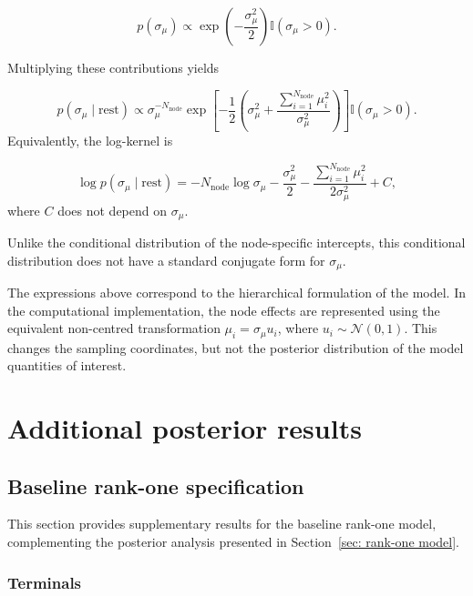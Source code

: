 \documentclass[pdftex,12pt,openright,a4paper,oneside]{book}
\begin{document}
\begin{equation*}
p(\sigma_\mu)
\propto
\exp\left(
-\frac{\sigma_\mu^2}{2}
\right)
\mathbb{I}(\sigma_\mu>0).
\end{equation*}

Multiplying these contributions yields

\begin{equation*}
p(\sigma_\mu\mid\mathrm{rest})
\propto 
\sigma_\mu^{-N_{\mathrm{node}}}
\exp\left[
-\frac12
\left(
\sigma_\mu^2+
\frac{
\sum_{i=1}^{N_{\mathrm{node}}}\mu_i^2
}{
\sigma_\mu^2
}
\right)
\right]
\mathbb{I}(\sigma_\mu>0).
\end{equation*}
Equivalently, the log-kernel is

\begin{equation*}
\log p(\sigma_\mu\mid\mathrm{rest})
=
-N_{\mathrm{node}}\log\sigma_\mu
-\frac{\sigma_\mu^2}{2}
-\frac{
\sum_{i=1}^{N_{\mathrm{node}}}\mu_i^2
}{
2\sigma_\mu^2
}
+C,
\end{equation*}
where $C$ does not depend on $\sigma_\mu$.

Unlike the conditional distribution of the
node-specific intercepts, this conditional
distribution does not have a standard
conjugate form for $\sigma_\mu$.

The expressions above correspond to the
hierarchical formulation of the model.
In the computational implementation,
the node effects are represented using
the equivalent non-centred transformation
$\mu_i=\sigma_\mu u_i$, where
$u_i\sim\mathcal{N}(0,1)$.
This changes the sampling coordinates,
but not the posterior distribution of
the model quantities of interest.

\chapter{Additional posterior results}
\label{app:additional_posterior_results}

\section{Baseline rank-one specification}
This section provides supplementary results for the baseline rank-one model, 
complementing the posterior analysis presented in Section~\ref{sec: rank-one model}.

\subsection{Terminals}
\label{app:terminals_add_posterior_results}
\end{document}
